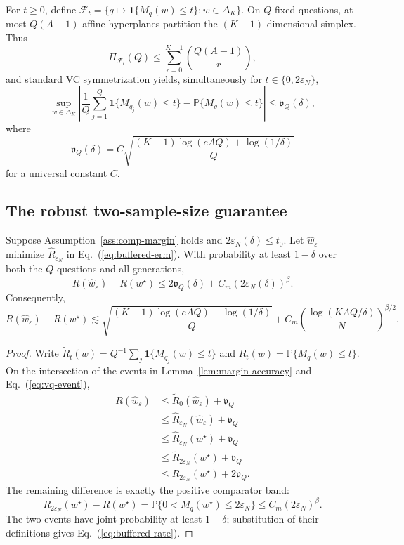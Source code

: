 For \(t\ge0\), define
\(\mathcal F_t=\{q\mapsto\mathbf 1\{M_q(w)\le t\}:w\in\Delta_K\}\).
On \(Q\) fixed questions, at most \(Q(A-1)\) affine hyperplanes partition the
\((K-1)\)-dimensional simplex.  Thus
\[
\Pi_{\mathcal F_t}(Q)
\le
\sum_{r=0}^{K-1}\binom{Q(A-1)}r,
\]
and standard VC symmetrization yields, simultaneously for
\(t\in\{0,2\varepsilon_N\}\),
\begin{equation}
\sup_{w\in\Delta_K}
\left|
\frac1Q\sum_{j=1}^Q\mathbf 1\{M_{q_j}(w)\le t\}
-
\mathbb P\{M_q(w)\le t\}
\right|
\le
\mathfrak v_Q(\delta),
\label{eq:vq-event}
\end{equation}
where
\[
\mathfrak v_Q(\delta)
=
C\sqrt{
\frac{(K-1)\log(eAQ)+\log(1/\delta)}{Q}
}
\]
for a universal constant \(C\).

\subsection{The robust two-sample-size guarantee}
\label{sec:theory-main}

\begin{theorem}
\label{thm:buffered-main}
Suppose Assumption~\ref{ass:comp-margin} holds and
\(2\varepsilon_N(\delta)\le t_0\).  Let
\(\widehat w_\varepsilon\) minimize
\(\widehat R_{\varepsilon_N}\) in Eq.~(\ref{eq:buffered-erm}).  With
probability at least \(1-\delta\) over both the \(Q\) questions and all
generations,
\begin{equation}
R(\widehat w_\varepsilon)-R(w^\star)
\le
2\mathfrak v_Q(\delta)
+
C_m(2\varepsilon_N(\delta))^\beta.
\label{eq:buffered-main-bound}
\end{equation}
Consequently,
\begin{equation}
R(\widehat w_\varepsilon)-R(w^\star)
\lesssim
\sqrt{\frac{(K-1)\log(eAQ)+\log(1/\delta)}{Q}}
+
C_m
\left(\frac{\log(KAQ/\delta)}{N}\right)^{\beta/2}.
\label{eq:buffered-rate}
\end{equation}
\end{theorem}

\begin{proof}
Write
\(\widetilde R_t(w)=Q^{-1}\sum_j\mathbf 1\{M_{q_j}(w)\le t\}\) and
\(R_t(w)=\mathbb P\{M_q(w)\le t\}\).  On the intersection of the events in
Lemma~\ref{lem:margin-accuracy} and Eq.~(\ref{eq:vq-event}),
\[
\begin{aligned}
R(\widehat w_\varepsilon)
&\le \widetilde R_0(\widehat w_\varepsilon)+\mathfrak v_Q \\
&\le \widehat R_{\varepsilon_N}(\widehat w_\varepsilon)+\mathfrak v_Q \\
&\le \widehat R_{\varepsilon_N}(w^\star)+\mathfrak v_Q \\
&\le \widetilde R_{2\varepsilon_N}(w^\star)+\mathfrak v_Q \\
&\le R_{2\varepsilon_N}(w^\star)+2\mathfrak v_Q.
\end{aligned}
\]
The remaining difference is exactly the positive comparator band:
\[
R_{2\varepsilon_N}(w^\star)-R(w^\star)
=
\mathbb P\{0<M_q(w^\star)\le2\varepsilon_N\}
\le C_m(2\varepsilon_N)^\beta.
\]
The two events have joint probability at least \(1-\delta\); substitution of
their definitions gives Eq.~(\ref{eq:buffered-rate}).
\end{proof}

